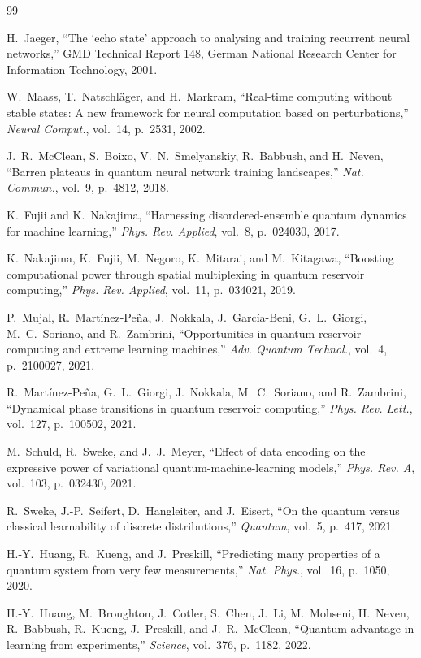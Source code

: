﻿\documentclass[10pt,conference]{IEEEtran}
\begin{document}
\footnotesize
\begin{thebibliography}{99}

 H.~Jaeger, ``The `echo state' approach to analysing and
training recurrent neural networks,'' GMD Technical Report 148, German National
Research Center for Information Technology, 2001.

 W.~Maass, T.~Natschl\"ager, and H.~Markram, ``Real-time
computing without stable states: A new framework for neural computation based on
perturbations,'' \emph{Neural Comput.}, vol.~14, p.~2531, 2002.

 J.~R.~McClean, S.~Boixo, V.~N.~Smelyanskiy, R.~Babbush, and
H.~Neven, ``Barren plateaus in quantum neural network training landscapes,''
\emph{Nat. Commun.}, vol.~9, p.~4812, 2018.

 K.~Fujii and K.~Nakajima, ``Harnessing disordered-ensemble
quantum dynamics for machine learning,'' \emph{Phys. Rev. Applied}, vol.~8,
p.~024030, 2017.

 K.~Nakajima, K.~Fujii, M.~Negoro, K.~Mitarai, and
M.~Kitagawa, ``Boosting computational power through spatial multiplexing in
quantum reservoir computing,'' \emph{Phys. Rev. Applied}, vol.~11, p.~034021,
2019.

 P.~Mujal, R.~Mart\'inez-Pe\~na, J.~Nokkala, J.~Garc\'ia-Beni,
G.~L.~Giorgi, M.~C.~Soriano, and R.~Zambrini, ``Opportunities in quantum reservoir
computing and extreme learning machines,'' \emph{Adv. Quantum Technol.}, vol.~4,
p.~2100027, 2021.

 R.~Mart\'inez-Pe\~na, G.~L.~Giorgi, J.~Nokkala,
M.~C.~Soriano, and R.~Zambrini, ``Dynamical phase transitions in quantum reservoir
computing,'' \emph{Phys. Rev. Lett.}, vol.~127, p.~100502, 2021.

 M.~Schuld, R.~Sweke, and J.~J.~Meyer, ``Effect of data
encoding on the expressive power of variational quantum-machine-learning models,''
\emph{Phys. Rev. A}, vol.~103, p.~032430, 2021.

 R.~Sweke, J.-P.~Seifert, D.~Hangleiter, and J.~Eisert, ``On
the quantum versus classical learnability of discrete distributions,''
\emph{Quantum}, vol.~5, p.~417, 2021.

 H.-Y.~Huang, R.~Kueng, and J.~Preskill, ``Predicting many
properties of a quantum system from very few measurements,'' \emph{Nat. Phys.},
vol.~16, p.~1050, 2020.

 H.-Y.~Huang, M.~Broughton, J.~Cotler, S.~Chen, J.~Li,
M.~Mohseni, H.~Neven, R.~Babbush, R.~Kueng, J.~Preskill, and J.~R.~McClean,
``Quantum advantage in learning from experiments,'' \emph{Science}, vol.~376,
p.~1182, 2022.

\end{thebibliography}
\end{document}
